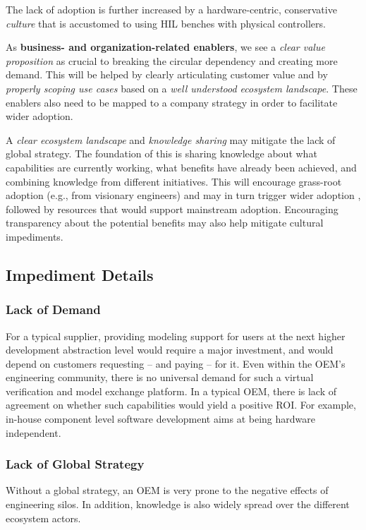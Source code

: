 The lack of adoption is further increased by a hardware-centric, conservative \emph{culture} that is accustomed to using HIL benches with physical controllers.

As \textbf{business- and organization-related enablers}, %
we see a \emph{clear value proposition} as crucial to breaking the circular dependency and creating more demand.
This will be helped by clearly articulating customer value and by \emph{properly scoping use cases} based on a \emph{well understood ecosystem landscape}.
These enablers also need to be mapped to a company strategy in order to facilitate wider adoption. 

A \emph{clear ecosystem landscape} and \emph{knowledge sharing} may mitigate the lack of global strategy.
The foundation of this is sharing knowledge about what capabilities are currently working, what benefits have already been achieved, and combining knowledge from different initiatives.
This will encourage grass-root adoption (e.g., from visionary engineers) and may in turn trigger wider adoption
{, followed by resources that would support mainstream adoption. Encouraging transparency about the potential benefits may also help mitigate cultural impediments.}

\subsection{Impediment Details}
\subsubsection*{Lack of Demand}
For a typical supplier,
providing modeling support for users at the next higher development abstraction level would require a major investment,
and would depend on customers requesting -- and paying -- for it.
%
Even within the OEM's engineering community, there is no universal demand
for such a virtual verification and model exchange platform.
In a typical OEM, there is lack of agreement on whether such capabilities would yield a positive ROI.
For example, in-house component level software development aims at being hardware independent.


\subsubsection*{Lack of Global Strategy}
Without a global strategy, an OEM is very prone to the negative effects of engineering silos.
In addition, knowledge is also widely spread over the different ecosystem actors.

